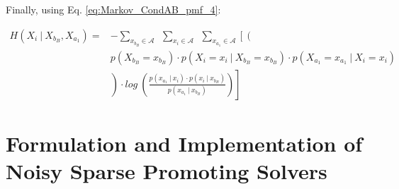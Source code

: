 Finally, using Eq. \eqref{eq:Markov_CondAB_pmf_4}:

\begin{align}
\label{eq:Markov_CondAB_H_Reduced_FullNom_FORTWO_2}
	H(X_{i} \ | \ X_{b_{B}} , X_{a_{1}}) = & - \sum_{  x_{b_{B}} \in \mathcal{A}  }{ \ \ \sum_{ x_{i} \in \mathcal{A} }{ \ \ \sum_{  x_{a_{1}} \in \mathcal{A}      }{ }}} \left[ \left(   \right. \right.  \nonumber \\
			&	p(X_{b_{B}} = x_{b_{B}}) \cdot p(X_{i} = x_{i} \ | \ X_{b_{B}} = x_{b_{B}}) \cdot p(X_{a_{1}} = x_{a_{1}} \ | \ X_{i} = x_{i})     \nonumber \\
  		& \left. \left.	\right) \cdot log  \  \left(      \frac{  p(x_{a_{1}}  \ | \   x_{i} ) \cdot p(x_{i}  \ | \ x_{b_{B}})  }{      p(x_{a_{1}} \ | \ x_{b_{B}} )  }   \right)     \right]  
\end{align}






































































\newpage
\section{Formulation and Implementation of Noisy Sparse Promoting Solvers}
\label{sec_Meth_aNSR}


